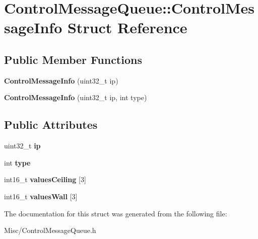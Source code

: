 \hypertarget{structControlMessageQueue_1_1ControlMessageInfo}{}\section{Control\+Message\+Queue\+:\+:Control\+Message\+Info Struct Reference}
\label{structControlMessageQueue_1_1ControlMessageInfo}
\subsection*{Public Member Functions}
\begin{DoxyCompactItemize}
\item 
{\bfseries Control\+Message\+Info} (uint32\+\_\+t ip)\hypertarget{structControlMessageQueue_1_1ControlMessageInfo_a343b872010632c73cd5d811f0439db65}{}\label{structControlMessageQueue_1_1ControlMessageInfo_a343b872010632c73cd5d811f0439db65}

\item 
{\bfseries Control\+Message\+Info} (uint32\+\_\+t ip, int type)\hypertarget{structControlMessageQueue_1_1ControlMessageInfo_ab3d25b3f23c684a35f85ecad82c4b0de}{}\label{structControlMessageQueue_1_1ControlMessageInfo_ab3d25b3f23c684a35f85ecad82c4b0de}

\end{DoxyCompactItemize}
\subsection*{Public Attributes}
\begin{DoxyCompactItemize}
\item 
uint32\+\_\+t {\bfseries ip}\hypertarget{structControlMessageQueue_1_1ControlMessageInfo_a9c729d9dd8e2bbabfbdfcdaf845065f6}{}\label{structControlMessageQueue_1_1ControlMessageInfo_a9c729d9dd8e2bbabfbdfcdaf845065f6}

\item 
int {\bfseries type}\hypertarget{structControlMessageQueue_1_1ControlMessageInfo_a0166019e4c749c1fcea08074c641af3e}{}\label{structControlMessageQueue_1_1ControlMessageInfo_a0166019e4c749c1fcea08074c641af3e}

\item 
int16\+\_\+t {\bfseries values\+Ceiling} \mbox{[}3\mbox{]}\hypertarget{structControlMessageQueue_1_1ControlMessageInfo_aab343940b8582a6f6b0a36b16879b685}{}\label{structControlMessageQueue_1_1ControlMessageInfo_aab343940b8582a6f6b0a36b16879b685}

\item 
int16\+\_\+t {\bfseries values\+Wall} \mbox{[}3\mbox{]}\hypertarget{structControlMessageQueue_1_1ControlMessageInfo_a7a3bd15c760863933774d32359cf4411}{}\label{structControlMessageQueue_1_1ControlMessageInfo_a7a3bd15c760863933774d32359cf4411}

\end{DoxyCompactItemize}


The documentation for this struct was generated from the following file\+:\begin{DoxyCompactItemize}
\item 
Misc/Control\+Message\+Queue.\+h\end{DoxyCompactItemize}
